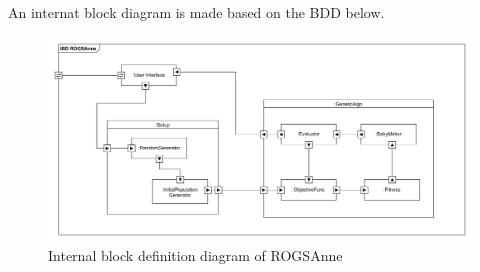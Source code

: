 An internat block diagram is made based on the BDD below. 

\begin{figure}[H]
	\centering
	\includegraphics[width=\textwidth]{Images/IBD_ROGSAnne.png}
	\caption{Internal block definition diagram of ROGSAnne}
	\label{fig:IBD}
\end{figure}


